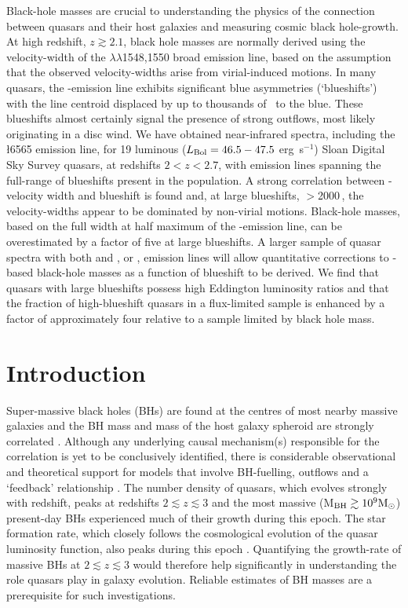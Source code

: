 Black-hole masses are crucial to understanding the physics of the connection between quasars and their host galaxies and measuring cosmic black hole-growth. 
At high redshift, $z \gtrsim 2.1$, black hole masses are normally derived using the velocity-width of the $\lambda\lambda$1548,1550 broad emission line, based on the assumption that the observed velocity-widths arise from virial-induced motions.  
In many quasars, the -emission line exhibits significant blue asymmetries (`blueshifts') with the line centroid displaced by up to thousands of \kms\, to the blue. 
These blueshifts almost certainly signal the presence of strong outflows, most likely originating in a disc wind.
We have obtained near-infrared spectra, including the \ha\l6565 emission line, for 19 luminous ($L_{\rm Bol} = 46.5-47.5$ erg~s$^{-1}$) Sloan Digital Sky Survey quasars, at redshifts $2 < z < 2.7$, with  emission lines spanning the full-range of blueshifts present in the population.  
A strong correlation between -velocity width and blueshift is found and, at large blueshifts, $>$2000\,\kms, the velocity-widths appear to be dominated by non-virial motions. 
Black-hole masses, based on the full width at half maximum of the -emission line, can be overestimated by a factor of five at large blueshifts. 
A larger sample of quasar spectra with both  and \hbns, or \hans, emission lines will allow quantitative corrections to -based black-hole masses as a function of blueshift to be derived. 
We find that quasars with large  blueshifts possess high Eddington luminosity ratios and that the fraction of high-blueshift quasars in a flux-limited sample is enhanced by a factor of approximately four relative to a sample limited by black hole mass.    

\section{Introduction}

Super-massive black holes (BHs) are found at the centres of most nearby massive galaxies and the BH mass and mass of the host galaxy spheroid are strongly correlated \citep{ferrarese00,gebhardt00,kormendy13}. 
Although any underlying causal mechanism(s) responsible for the correlation is yet to be conclusively identified, there is considerable observational and theoretical support for models that involve BH-fuelling, outflows and a `feedback' relationship \citep[e.g.][]{king15}.  
The number density of quasars, which evolves strongly with redshift, peaks at redshifts $2 \lesssim z \lesssim 3$ \citep[e.g.][]{brandt05,richards06b} and the most massive (M$_{\rm BH} \gtrsim 10^9{{{\rm M_\odot}}}$) present-day BHs experienced much of their growth during this epoch.  
The star formation rate, which closely follows the cosmological evolution of the quasar luminosity function, also peaks during this epoch \citep[e.g.][]{boyle98}. 
Quantifying the growth-rate of massive BHs at $2 \lesssim z \lesssim 3$ would therefore help significantly in understanding the role quasars play in galaxy evolution.
Reliable estimates of BH masses are a prerequisite for such investigations. 

